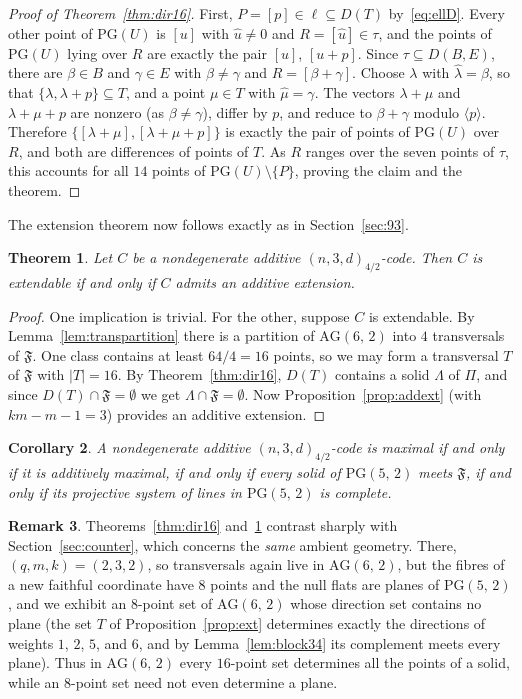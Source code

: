 \documentclass[12pt]{article}
\newtheorem{thm}{Theorem}[section]
\newtheorem{cor}[thm]{Corollary}
\theoremstyle{definition}
\newtheorem{rem}[thm]{Remark}
\numberwithin{equation}{section}
\newcommand{\la}{\lambda}
\newcommand{\PG}[2]{\mathrm{PG}(#1,\,#2)}
\newcommand{\PGv}[1]{\mathrm{PG}(#1)}
\newcommand{\AG}[2]{\mathrm{AG}(#1,\,#2)}
\newcommand{\Afold}{\mathfrak{F}}
\begin{document}
\begin{proof}[Proof of Theorem~\ref{thm:dir16}]
First, $P=[p]\in\ell\subseteq D(T)$ by~\eqref{eq:ellD}.  Every other point of $\PGv U$ is $[u]$ with $\widehat u\neq0$ and $R=[\widehat u]\in\tau$, and the points of $\PGv U$ lying over $R$ are exactly the pair $[u]$, $[u+p]$.  Since $\tau\subseteq D(B,E)$, there are $\beta\in B$ and $\gamma\in E$ with $\beta\neq\gamma$ and $R=[\beta+\gamma]$.  Choose $\la$ with $\widehat\la=\beta$, so that $\{\la,\la+p\}\subseteq T$, and a point $\mu\in T$ with $\widehat\mu=\gamma$.  The vectors $\la+\mu$ and $\la+\mu+p$ are nonzero (as $\beta\neq\gamma$), differ by $p$, and reduce to $\beta+\gamma$ modulo $\langle p\rangle$. Therefore $\{[\la+\mu],[\la+\mu+p]\}$ is exactly the pair of points of $\PGv U$ over $R$, and both are differences of points of $T$.  As $R$ ranges over the seven points of $\tau$, this accounts for all $14$ points of $\PGv U\setminus\{P\}$, proving the claim and the theorem. 
\end{proof}

The extension theorem now follows exactly as in Section~\ref{sec:93}.

\begin{thm}\label{thm:43}
Let $C$ be a nondegenerate additive $(n,3,d)_{4/2}$-code.  Then $C$ is extendable if and only if $C$ admits an additive extension.
\end{thm}

\begin{proof}
One implication is trivial.  For the other, suppose $C$ is extendable. By Lemma~\ref{lem:transpartition} there is a partition of $\AG62$ into $4$ transversals of $\Afold$. One class contains at least $64/4=16$ points, so we may form a transversal $T$ of $\Afold$ with $|T|=16$.  By Theorem~\ref{thm:dir16}, $D(T)$ contains a solid $\Lambda$ of $\Pi$, and since $D(T)\cap\Afold=\emptyset$ we get $\Lambda\cap\Afold=\emptyset$.  Now Proposition~\ref{prop:addext} (with $km-m-1=3$) provides an additive extension.
\end{proof}

\begin{cor}\label{cor:43max}
A nondegenerate additive $(n,3,d)_{4/2}$-code is maximal if and only if it is additively maximal, if and only if every solid of $\PG52$ meets $\Afold$, if and only if its projective system of lines in $\PG52$ is complete.
\end{cor}

\begin{rem}\label{rem:contrast}
Theorems~\ref{thm:dir16} and~\ref{thm:43} contrast sharply with Section~\ref{sec:counter}, which concerns the \emph{same} ambient geometry. There, $(q,m,k)=(2,3,2)$, so transversals again live in $\AG62$, but the fibres of a new faithful coordinate have $8$ points and the null flats are planes of $\PG52$, and we exhibit an $8$-point set of
$\AG62$ whose direction set contains no plane (the set $T$ of Proposition~\ref{prop:ext} determines exactly the directions of weights $1$, $2$, $5$, and $6$, and by Lemma~\ref{lem:block34} its complement meets every plane).  Thus in $\AG62$ every $16$-point set determines all the points of a solid, while an $8$-point set need not even determine a plane.
\end{rem}
\end{document}
